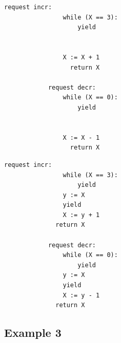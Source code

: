 \noindent
\begin{minipage}[t]{0.45\textwidth}
	\begin{lstlisting}[caption={Serializable},
		label={lst:FredSer},numbers=none]
			request incr: 
			    while (X == 3):
			        yield
			        
			        
			    X := X + 1
				  return X		
			
			request decr: 
			    while (X == 0): 
			        yield
			        
			        
			    X := X - 1
				  return X
		\end{lstlisting}
\end{minipage}
\hfill
\begin{minipage}[t]{0.45\textwidth}
	\begin{lstlisting}[caption={Not serializable},
		label={lst:FredNonSer},numbers=none]
			request incr:
			    while (X == 3):
			        yield
			    y := X
			    yield
			    X := y + 1
		      return X		
			
			request decr: 
			    while (X == 0):
			        yield
			    y := X
			    yield
			    X := y - 1
		      return X
		\end{lstlisting}
\end{minipage}
	
\subsection{Example 3}

